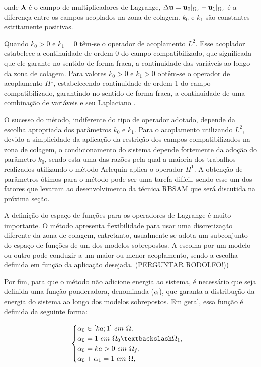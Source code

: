 \documentclass[tese_patricia]{subfiles}
\begin{document}
\noindent onde $\boldsymbol{\lambda}$ é o campo de multiplicadores de Lagrange, $\Delta \mathbf{u} = \mathbf{u}_0 |_{\Omega_c} - \mathbf{u}_1 |_{\Omega_c}$ é a diferença entre os campos acoplados na zona de colagem. $k_{0}$ e $k_{1}$ são constantes estritamente positivas. 

Quando $k_{0} > 0$ e $k_{1} = 0 $ têm-se o operador de acoplamento $L^{2}$. Esse acoplador estabelece a continuidade de ordem 0 do campo compatibilizado, que significada que ele garante no sentido de forma fraca, a continuidade das variáveis ao longo da zona de colagem. Para valores $k_{0} > 0$ e $k_{1} > 0 $ obtêm-se o operador de acoplamento $H^{1}$, estabelecendo continuidade de ordem 1 do campo compatibilizado, garantindo no sentido de forma fraca, a continuidade de uma combinação de variáveis e seu Laplaciano \cite{GuidaultAndBelytschko2007}.

O sucesso do método, indiferente do tipo de operador adotado, depende da escolha apropriada dos parâmetros $k_{0}$ e $k_{1}$. Para o acoplamento utilizando $L^{2}$, devido a simplicidade da aplicação da restrição dos campos compatibilizados na zona de colagem, o condicionamento do sistema depende fortemente da adoção do parâmetro $k_{0}$, sendo esta uma das razões pela qual a maioria dos trabalhos realizados utilizando o método Arlequin aplica o operador $H^{1}$. A obtenção de parâmetros ótimos para o método pode ser uma tarefa difícil, sendo esse um dos fatores que levaram  ao desenvolvimento da técnica RBSAM que será discutida na próxima seção.

A definição do espaço de funções para os operadores de Lagrange é muito importante. O método apresenta flexibilidade para usar uma discretização diferente da zona de colagem, entretanto, usualmente se adota um subconjunto do espaço de funções de um dos modelos sobrepostos. A escolha por um modelo ou outro pode conduzir a um maior ou menor acoplamento, sendo a escolha definida em função da aplicação desejada. (PERGUNTAR RODOLFO!))  

Por fim, para que o método não adicione energia ao sistema, é necessário que seja definida uma função ponderadora, denominada ($\alpha$), que garanta a distribução da energia do sistema ao longo dos modelos sobrepostos. Em geral, essa função é definida da seguinte forma:


\begin{align}
	\begin{cases} \arlequinWF_{0} \in [ka;1] \ em \ \Omega, \\ 
	\arlequinWF_{0} = 1 \ em \ \Omega_{0} \textbackslash \Omega_{1},  \\
	\arlequinWF_{0}  = ka > 0 \ em \ \Omega_{f}, \\
	\arlequinWFGlobal + \arlequinWFLocal = 1 \ em \ \Omega,
	\end{cases} \label{eq:alphai}
\end{align}
\end{document}
